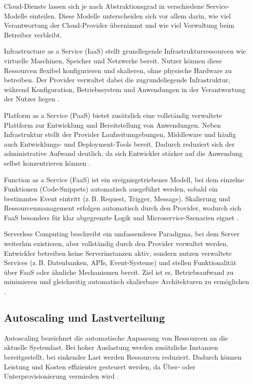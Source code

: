 Cloud-Dienste lassen sich je nach Abstraktionsgrad in verschiedene Service-Modelle einteilen. Diese Modelle unterscheiden sich vor allem darin, wie viel Verantwortung der Cloud-Provider übernimmt und wie viel Verwaltung beim Betreiber verbleibt.

Infrastructure as a Service (IaaS) stellt grundlegende Infrastrukturressourcen wie virtuelle Maschinen, Speicher und Netzwerke bereit. Nutzer können diese Ressourcen flexibel konfigurieren und skalieren, ohne physische Hardware zu betreiben. Der Provider verwaltet dabei die zugrundeliegende Infrastruktur, während Konfiguration, Betriebssystem und Anwendungen in der Verantwortung der Nutzer liegen \cite{azure_iaas}.

Platform as a Service (PaaS) bietet zusätzlich eine vollständig verwaltete Plattform zur Entwicklung und Bereitstellung von Anwendungen. Neben Infrastruktur stellt der Provider Laufzeitumgebungen, Middleware und häufig auch Entwicklungs- und Deployment-Tools bereit. Dadurch reduziert sich der administrative Aufwand deutlich, da sich Entwickler stärker auf die Anwendung selbst konzentrieren können \cite{azure_paas}.

Function as a Service (FaaS) ist ein ereignisgetriebenes Modell, bei dem einzelne Funktionen (Code-Snippets) automatisch ausgeführt werden, sobald ein bestimmtes Event eintritt (z.\,B. Request, Trigger, Message). Skalierung und Ressourcenmanagement erfolgen automatisch durch den Provider, wodurch sich FaaS besonders für klar abgegrenzte Logik und Microservice-Szenarien eignet \cite{ibm_faas}.

Serverless Computing beschreibt ein umfassenderes Paradigma, bei dem Server weiterhin existieren, aber vollständig durch den Provider verwaltet werden. Entwickler betreiben keine Serverinstanzen aktiv, sondern nutzen verwaltete Services (z.\,B. Datenbanken, APIs, Event-Systeme) und stellen Funktionalität über FaaS oder ähnliche Mechanismen bereit. Ziel ist es, Betriebsaufwand zu minimieren und gleichzeitig automatisch skalierbare Architekturen zu ermöglichen \cite{redhat_serverless}.

\subsection{Autoscaling und Lastverteilung}

Autoscaling bezeichnet die automatische Anpassung von Ressourcen an die aktuelle Systemlast. Bei hoher Auslastung werden zusätzliche Instanzen bereitgestellt, bei sinkender Last werden Ressourcen reduziert. Dadurch können Leistung und Kosten effizienter gesteuert werden, da Über- oder Unterprovisionierung vermieden wird \cite{teamtakt_devops_lastverteilung}.

